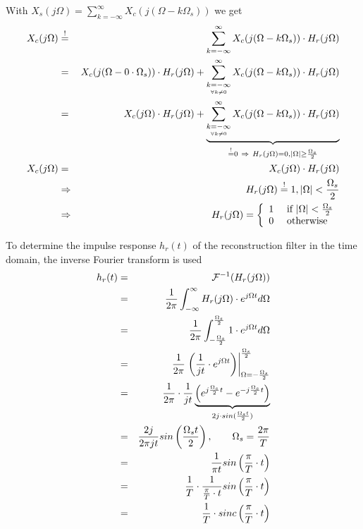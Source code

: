 With $X_s(j\Omega) = \sum_{k=-\infty}^{\infty} X_c(j(\Omega-k\Omega_s) )$ we get
\begin{eqnarray*}
X_c(j\Omega) & \overset{!}{=} &  \sum_{k=-\infty}^{\infty} X_c(j(\Omega-k\Omega_s) ) \* H_r(j\Omega) \\
& = & X_c(j(\Omega-0\*\Omega_s) ) \* H_r(j\Omega) +  \sum_{\underset{\forall k \neq 0}{k=-\infty}}^{\infty} X_c(j(\Omega-k\Omega_s) ) \* H_r(j\Omega) \\
& = & X_c(j\Omega ) \* H_r(j\Omega) +  \underbrace{\sum_{\underset{\forall k \neq 0}{k=-\infty}}^{\infty} X_c(j(\Omega-k\Omega_s) ) \* H_r(j\Omega)}_{\overset{!}{=} 0 \ \Rightarrow \ H_r(j\Omega) = 0, |\Omega| \geq \frac{\Omega_s}{2}} \\
X_c(j\Omega) & = & X_c(j\Omega ) \* H_r(j\Omega) \\
& \Rightarrow & H_r(j\Omega) \overset{!}{=} 1, |\Omega| < \frac{\Omega_s}{2} \\
& \Rightarrow & H_r(j\Omega) = \left\{ \begin{array}{rl}
1 &\mbox{ if $|\Omega| < \frac{\Omega_s}{2}$} \\
0 &\mbox{ otherwise}
\end{array} \right.
\end{eqnarray*}

To determine the impulse response $h_r(t)$ of the reconstruction filter in the time domain, the inverse Fourier transform is used
\begin{eqnarray*}
h_r(t) & = & \mathcal{F}^{-1}(H_r(j\Omega))\\
& = & \frac{1}{2\pi} \int_{-\infty}^{\infty} H_r(j\Omega) \cdot e^{j \Omega t} d\Omega \\
& = & \frac{1}{2\pi} \int_{-\frac{\Omega_s}{2}}^{\frac{\Omega_s}{2}} 1 \cdot e^{j \Omega t} d\Omega \\
& = & \frac{1}{2\pi} \left. \left( \frac{1}{jt}  \cdot e^{j \Omega t} \right) \right|_{\Omega= -\frac{\Omega_s}{2}}^{\frac{\Omega_s}{2}} \\
& = & \frac{1}{2\pi} \cdot \frac{1}{jt} \underbrace{\left( e^{j \frac{\Omega_s}{2} t} - e^{-j \frac{\Omega_s}{2} t} \right)}_{2j\cdot sin(\frac{\Omega_s t}{2})} \\
& = & \frac{2j}{2\pi jt} sin\left(\frac{\Omega_s t}{2}\right), \qquad \Omega_s = \frac{2\pi}{T}\\
& = & \frac{1}{\pi t} sin\left(\frac{\pi}{T}\cdot t\right) \\
& = & \frac{1}{T} \cdot \frac{1}{\frac{\pi}{T} \cdot t} sin\left(\frac{\pi}{T}\cdot t\right) \\
& = & \frac{1}{T} \cdot sinc\left(\frac{\pi}{T}\cdot t\right)
\end{eqnarray*}

